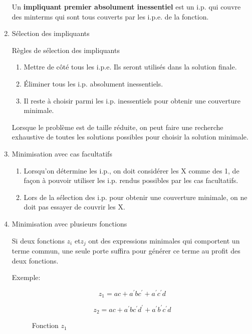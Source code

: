 \documentclass[letter, oneside]{book}
\begin{document}
\begin{enumerate}
Un \textbf{impliquant premier absolument inessentiel} est un i.p. qui couvre
des minterms qui sont tous couverts par les i.p.e. de la fonction.

\item Sélection des impliquants
\label{sec:orga506120}

Règles de sélection des impliquants

\begin{enumerate}
\item Mettre de côté tous les i.p.e. Ils seront utilisés dans la solution
finale.

\item Éliminer tous les i.p. absolument inessentiels.

\item Il reste à choisir parmi les i.p. inessentiels pour obtenir une
couverture minimale.
\end{enumerate}

Lorsque le problème est de taille réduite, on peut faire une recherche
exhaustive de toutes les solutions possibles pour choisir la solution
minimale.

\item Minimisation avec cas facultatifs
\label{sec:org94d8276}

\begin{enumerate}
\item Lorsqu'on détermine les i.p., on doit considérer les X comme des
1, de façon à pouvoir utiliser les i.p. rendus possibles par les
cas facultatifs.

\item Lors de la sélection des i.p. pour obtenir une couverture
minimale, on ne doit pas essayer de couvrir les X.
\end{enumerate}

\item Minimisation avec plusieurs fonctions
\label{sec:org1bc1e85}

Si deux fonctions \(z_i\) et\(z_j\) ont des expressions minimales qui
comportent un terme commun, une seule porte suffira pour générer ce
terme au profit des deux fonctions.

Exemple:

$$z_1 = a c + a^{\prime} b c^{\prime} + a^{\prime} c^{\prime} d$$

$$z_2 = a c + a^{\prime}  b c^{\prime} d^{\prime} +
a^{\prime} b^{\prime} c^{\prime} d$$

\begin{figure}[htbp]
\centering

\caption{\label{fig:org592ae5c}Fonction \(z_1\)}
\end{figure}


\end{enumerate}
\end{document}
